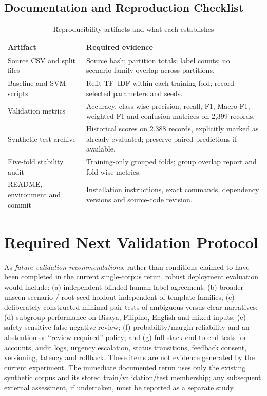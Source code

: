 \subsection{Documentation and Reproduction Checklist}
\begin{table}[H]\centering\caption{Reproducibility artifacts and what each establishes}\label{tab:preruncheck}\small
\begin{tabularx}{\textwidth}{p{}X}\toprule
Artifact & Required evidence \\\midrule
Source CSV and split files & Source hash; partition totals; label counts; no scenario-family overlap across partitions. \\
Baseline and SVM scripts & Refit TF--IDF within each training fold; record selected parameters and seeds. \\
Validation metrics & Accuracy, class-wise precision, recall, F1, Macro-F1, weighted-F1 and confusion matrices on 2,399 records. \\
Synthetic test archive & Historical scores on 2,388 records, explicitly marked as already evaluated; preserve paired predictions if available. \\
Five-fold stability audit & Training-only grouped folds; group overlap report and fold-wise metrics. \\
README, environment and commit & Installation instructions, exact commands, dependency versions and source-code revision. \\\bottomrule
\end{tabularx}\end{table}

\section{Required Next Validation Protocol}
As \emph{future validation recommendations}, rather than conditions claimed to have been completed in the current single-corpus rerun, robust deployment evaluation would include: (a) independent blinded human label agreement; (b) broader unseen-scenario / root-seed holdout independent of template families; (c) deliberately constructed minimal-pair tests of ambiguous versus clear narratives; (d) subgroup performance on Bisaya, Filipino, English and mixed inputs; (e) safety-sensitive false-negative review; (f) probability/margin reliability and an abstention or ``review required'' policy; and (g) full-stack end-to-end tests for accounts, audit logs, urgency escalation, status transitions, feedback consent, versioning, latency and rollback. These items are not evidence generated by the current experiment. The immediate documented rerun uses only the existing synthetic corpus and its stored train/validation/test membership; any subsequent external assessment, if undertaken, must be reported as a separate study.


